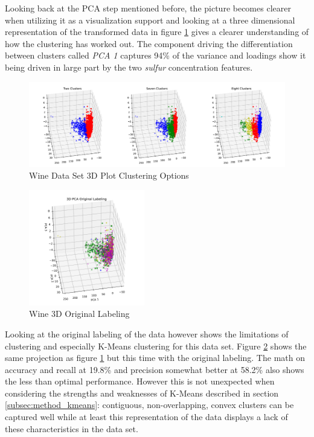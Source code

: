 Looking back at the PCA step mentioned before, the picture becomes clearer when utilizing it as a visualization support and looking at a three dimensional representation of the transformed data in figure \ref{fig:kmeans_wine_3d_multi} gives a clearer understanding of how the clustering has worked out. The component driving the differentiation between clusters called \textit{PCA 1} captures 94\% of the variance and loadings show it being driven in large part by the two \textit{sulfur} concentration features.

\begin{figure}[H]
\centering
\includegraphics[width=1.0\textwidth]{images/kmeans_wine_3d_multi.pdf}
\caption{Wine Data Set 3D Plot Clustering Options}
\label{fig:kmeans_wine_3d_multi}
\end{figure}

\vspace{-0.5cm}
\begin{figure}
  \centering
    \includegraphics[trim={1cm 0cm 1cm 1cm},width=0.45\textwidth, clip]{images/kmeans_wine_pca_original.pdf}
  \caption{Wine 3D Original Labeling}
  \label{fig:kmeans_wine_pca_original}
\end{figure}

Looking at the original labeling of the data however shows the limitations of clustering and especially K-Means clustering for this data set. Figure \ref{fig:kmeans_wine_pca_original} shows the same projection as figure \ref{fig:kmeans_wine_3d_multi} but this time with the original labeling. The math on accuracy and recall at 19.8\% and precision somewhat better at 58.2\% also shows the less than optimal performance. However this is not unexpected when considering the strengths and weaknesses of K-Means described in section \ref{subsec:method_kmeans}: contiguous, non-overlapping, convex clusters can be captured well while at least this representation of the data displays a lack of these characteristics in the data set.


